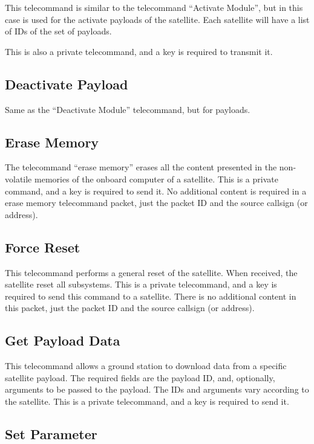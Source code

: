 This telecommand is similar to the telecommand ``Activate Module'', but in this case is used for the activate payloads of the satellite. Each satellite will have a list of IDs of the set of payloads.

This is also a private telecommand, and a key is required to transmit it.

\subsection{Deactivate Payload}

Same as the ``Deactivate Module'' telecommand, but for payloads.

\subsection{Erase Memory}

The telecommand ``erase memory'' erases all the content presented in the non-volatile memories of the onboard computer of a satellite. This is a private command, and a key is required to send it. No additional content is required in a erase memory telecommand packet, just the packet ID and the source callsign (or address).

\subsection{Force Reset}

This telecommand performs a general reset of the satellite. When received, the satellite reset all subsystems. This is a private telecommand, and a key is required to send this command to a satellite. There is no additional content in this packet, just the packet ID and the source callsign (or address).

\subsection{Get Payload Data}

This telecommand allows a ground station to download data from a specific satellite payload. The required fields are the payload ID, and, optionally, arguments to be passed to the payload. The IDs and arguments vary according to the satellite. This is a private telecommand, and a key is required to send it.

\subsection{Set Parameter}

